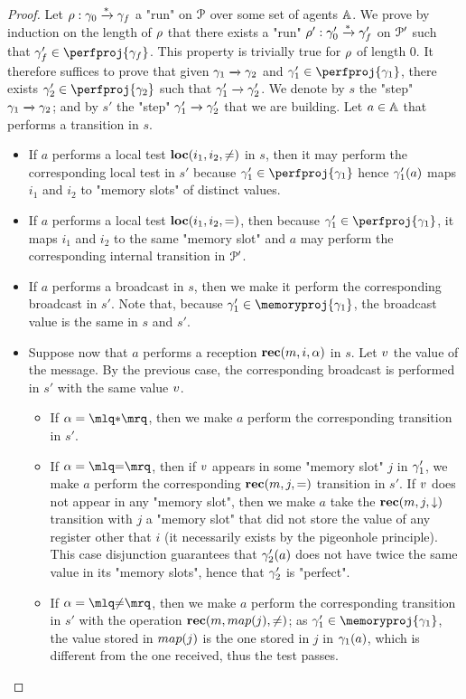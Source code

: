 \begin{proof}
	Let $\rho: \gamma_0 \xrightarrow{*} \gamma_f$ a "run" on $\mathcal{P}$ over some set of agents $\mathbb{A}$. We prove by induction on the length of $\rho$ that there exists a "run" $\rho': \gamma_0' \xrightarrow{*} \gamma_f'$ on $\mathcal{P}'$ such that $\config_f' \in \perfproj{\config_f}$. This property is trivially true for $\rho$ of length $0$. It therefore suffices to prove that given $\gamma_1 \xrightarrow{} \gamma_2$ and $\config_1' \in \perfproj{\config_1}$, there exists $\config_2' \in \perfproj{\config_2}$ such that $\gamma_1' \xrightarrow{} \gamma_2'$. We denote by $s$ the "step" $\gamma_1 \xrightarrow{} \gamma_2$; and by $s'$ the "step" $\gamma'_1 \xrightarrow{} \gamma'_2$ that we are building. 
	Let $a \in \mathbb{A}$ that performs a transition in $s$.
	\begin{itemize}
	\item If $a$ performs a local test $\textbf{loc}(i_1,i_2,{\ne})$ in $s$, then it may perform the corresponding local test in $s'$ because $\config_1' \in \perfproj{\config_1}$ hence $\gamma_1'(a)$ maps $i_1$ and $i_2$ to "memory slots" of distinct values. 
	\item If $a$ performs a local test  $\textbf{loc}(i_1,i_2,{=})$, then because $\config_1'\in \perfproj{\config_1}$, it maps $i_1$ and $i_2$ to the same "memory slot" and $a$ may perform the corresponding internal transition in $\mathcal{P}'$.  
	\item If $a$ performs a broadcast in $s$, then we make it perform the corresponding broadcast in $s'$. Note that, because $\config_1' \in \memoryproj{\config_1}$, the broadcast value is the same in $s$ and $s'$. 
	\item 
	Suppose now that $a$ performs a reception $\textbf{rec}(m, i, \alpha)$ in $s$. Let $v$ the value of the message. By the previous case, the corresponding broadcast is performed in $s'$ with the same value $v$. 
		\begin{itemize}
		\item If $\anact = \quotemarks{\dummyact}$, then we make $a$ perform the corresponding transition in $s'$. 
		\item If $\anact = \quotemarks{\eqtestact}$, then if $v$ appears in some "memory slot" $j$ in $\gamma_1'$, we make $a$ perform the corresponding $\textbf{rec}(m, j, {=})$ transition in $s'$. 
		If $v$ does not appear in any "memory slot", then we make $a$ take the $\textbf{rec}(m, j, \downarrow)$ transition with $j$ a "memory slot" that did not store the value of any register other that $i$ (it necessarily exists by the pigeonhole principle). This case disjunction guarantees that $\gamma_2'(a)$ does not have twice the same value in its "memory slots", hence that $\gamma_2'$ is "perfect".
		\item If $\anact = \quotemarks{\diseqtestact}$, then we make $a$ perform the corresponding transition in $s'$ with the operation $\rec{m}{\map(j)}{\neq}$; as $\config_1' \in \memoryproj{\config_1}$,  the value stored in $\map(j)$ is the one stored in $j$ in $\gamma_1(a)$, which is different from the one received, thus the test passes.
		\end{itemize}
	\end{itemize}


\end{proof}
